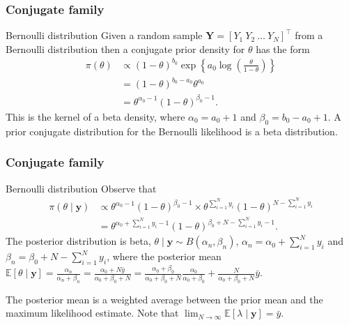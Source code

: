 \documentclass[12pt, compress]{beamer}
\begin{document}
\begin{frame}
	\frametitle{Conjugate family}
\begin{block}{Bernoulli distribution}
	Given a random sample $\bm{Y}=[Y_1 \ Y_2 \ \dots \ Y_N]^{\top}$ from a Bernoulli distribution then a conjugate prior density for $\theta$ has the form 
	\begin{align}
		\pi(\theta)&\propto (1-\theta)^{b_0} \exp\left\{a_0\log\left(\frac{\theta}{1-\theta}\right)\right\}\nonumber\\
		& = (1-\theta)^{b_0-a_0}\theta^{a_0}\nonumber\\
		& = \theta^{\alpha_0-1}(1-\theta)^{\beta_0-1}.\nonumber
	\end{align}
	This is the kernel of a beta density, where \( \alpha_0 = a_0 + 1 \) and \( \beta_0 = b_0 - a_0 + 1 \). A prior conjugate distribution for the Bernoulli likelihood is a beta distribution. 
\end{block}
\end{frame}

\begin{frame}
	\frametitle{Conjugate family}
	\begin{block}{Bernoulli distribution}
		Observe that
		\begin{align}
			\pi(\theta\mid \bm{y})&\propto \theta^{\alpha_0-1}(1-\theta)^{\beta_0-1} \times \theta^{\sum_{i=1}^N y_i}(1-\theta)^{N-\sum_{i=1}^Ny_i}\nonumber\\
			&= \theta^{\alpha_0+\sum_{i=1}^N y_i-1}(1-\theta)^{\beta_0+N-\sum_{i=1}^Ny_i-1}.\nonumber 
		\end{align}
		The posterior distribution is beta, $\theta\mid \bm{y}\sim B(\alpha_n,\beta_n)$, $\alpha_n=\alpha_0+\sum_{i=1}^N y_i$ and $\beta_n=\beta_0+N-\sum_{i=1}^Ny_i$, where the posterior mean $\mathbb{E}[\theta\mid \bm{y}]=\frac{\alpha_n}{\alpha_n+\beta_n}=\frac{\alpha_0+N\bar{y}}{\alpha_0+\beta_0+N}=\frac{\alpha_0+\beta_0}{\alpha_0+\beta_0+N}\frac{\alpha_0}{\alpha_0+\beta_0}+\frac{N}{\alpha_0+\beta_0+N}\bar{y}$. 
		
		The posterior mean is a weighted average between the prior mean and the maximum likelihood estimate. Note that \( \lim_{N \to \infty} \mathbb{E}[\lambda \mid \bm{y}] = \bar{y} \).
	\end{block}

\end{frame}
\end{document}
